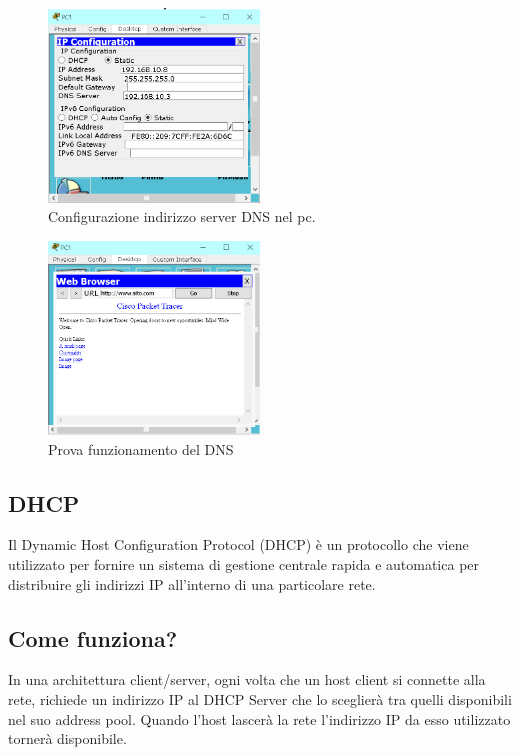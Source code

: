 \begin{figure}[htbp]
    \centering
    \includegraphics[width=0.5\textwidth]{images/06.servizi-rete/dns/02.conf-pc.png}
    \caption{Configurazione indirizzo server DNS nel pc.}
    \label{fig:dns-conf-pc}
\end{figure}

\begin{figure}[htbp]
    \centering
    \includegraphics[width=0.5\textwidth]{images/06.servizi-rete/dns/03.test.png}
    \caption{Prova funzionamento del DNS}
    \label{fig:dns-test}
\end{figure}

\subsection{DHCP}
Il Dynamic Host Configuration Protocol (DHCP) è un protocollo che viene utilizzato per fornire un sistema di gestione centrale rapida e automatica per distribuire gli indirizzi IP all'interno di una particolare rete.

\subsection*{Come funziona?}
In una architettura client/server, ogni volta che un host client si connette alla rete, richiede un indirizzo IP al DHCP Server che lo sceglierà tra quelli disponibili nel suo address pool. Quando l’host lascerà la rete l’indirizzo IP da esso utilizzato tornerà disponibile.

